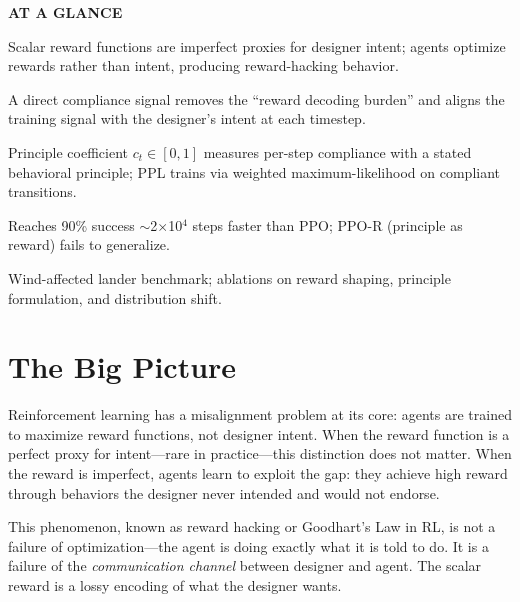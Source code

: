 \documentclass[10pt,twocolumn]{article}
\begin{document}
\begin{mdframed}[backgroundcolor=boxgray,linecolor=rulered,linewidth=1pt,
    innerleftmargin=6pt,innerrightmargin=6pt,
    innertopmargin=6pt,innerbottommargin=6pt]
\textbf{\small AT A GLANCE}\par\vspace{4pt}
\begin{description}[leftmargin=0pt,labelsep=4pt,itemsep=2pt,parsep=0pt,
    font=\small\bfseries]
  \item[Problem:] Scalar reward functions are imperfect proxies for designer intent; agents optimize rewards rather than intent, producing reward-hacking behavior.
  \item[Why it matters:] A direct compliance signal removes the ``reward decoding burden'' and aligns the training signal with the designer's intent at each timestep.
  \item[Method:] Principle coefficient $c_t \in [0,1]$ measures per-step compliance with a stated behavioral principle; PPL trains via weighted maximum-likelihood on compliant transitions.
  \item[Result:] Reaches 90\% success $\sim$2$\times$10$^4$ steps faster than PPO; PPO-R (principle as reward) fails to generalize.
  \item[Evidence:] Wind-affected lander benchmark; ablations on reward shaping, principle formulation, and distribution shift.
\end{description}
\end{mdframed}

\section{The Big Picture}

Reinforcement learning has a misalignment problem at its core: agents are trained to maximize reward functions, not designer intent.
When the reward function is a perfect proxy for intent---rare in practice---this distinction does not matter.
When the reward is imperfect, agents learn to exploit the gap: they achieve high reward through behaviors the designer never intended and would not endorse.

This phenomenon, known as reward hacking or Goodhart's Law in RL, is not a failure of optimization---the agent is doing exactly what it is told to do.
It is a failure of the \emph{communication channel} between designer and agent.
The scalar reward is a lossy encoding of what the designer wants.
\end{document}
